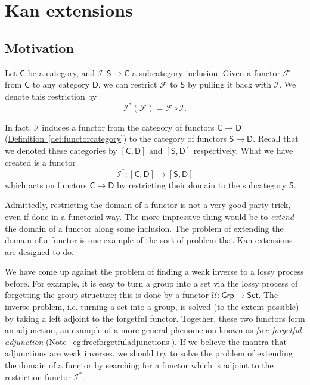 \documentclass[main.tex]{subfiles}
\begin{document}
\chapter{Kan extensions}
\label{sec:kan_extensions}

\section{Motivation}
\label{sec:kan_extensions_motivation}

Let $\mathsf{C}$ be a category, and $\mathcal{I}\colon \mathsf{S} \to \mathsf{C}$ a subcategory inclusion. Given a functor $\mathcal{F}$ from $\mathsf{C}$ to any category $\mathsf{D}$, we can restrict $\mathcal{F}$ to $\mathsf{S}$ by pulling it back with $\mathcal{I}$. We denote this restriction by
\begin{equation*}
  \mathcal{I}^{*}(\mathcal{F}) = \mathcal{F} \circ \mathcal{I}.
\end{equation*}

In fact, $\mathcal{I}$ induces a functor from the category of functors $\mathsf{C} \to \mathsf{D}$ (\hyperref[def:functorcategory]{Definition~\ref*{def:functorcategory}}) to the category of functors $\mathsf{S} \to \mathsf{D}$. Recall that we denoted these categories by $[\mathsf{C}, \mathsf{D}]$ and $[\mathsf{S}, \mathsf{D}]$ respectively. What we have created is a functor
\begin{equation*}
  \mathcal{I}^{*}\colon [\mathsf{C}, \mathsf{D}] \to [\mathsf{S}, \mathsf{D}]
\end{equation*}
which acts on functors $\mathsf{C} \to \mathsf{D}$ by restricting their domain to the subcategory $\mathsf{S}$.

Admittedly, restricting the domain of a functor is not a very good party trick, even if done in a functorial way. The more impressive thing would be to \emph{extend} the domain of a functor along some inclusion. The problem of extending the domain of a functor is one example of the sort of problem that Kan extensions are designed to do.

We have come up against the problem of finding a weak inverse to a lossy process before. For example, it is easy to turn a group into a set via the lossy process of forgetting the group structure; this is done by a functor $\mathcal{U}\colon \mathsf{Grp} \to \mathsf{Set}$. The inverse problem, i.e. turning a set into a group, is solved (to the extent possible) by taking a left adjoint to the forgetful functor. Together, these two functors form an adjunction, an example of a more general phenomenon known as \emph{free-forgetful adjunction} (\hyperref[eg:freeforgetfuladjunctions]{Note~\ref*{eg:freeforgetfuladjunctions}}). If we believe the mantra that adjunctions are weak inverses, we should try to solve the problem of extending the domain of a functor by searching for a functor which is adjoint to the restriction functor $\mathcal{I}^{*}$.
\end{document}
